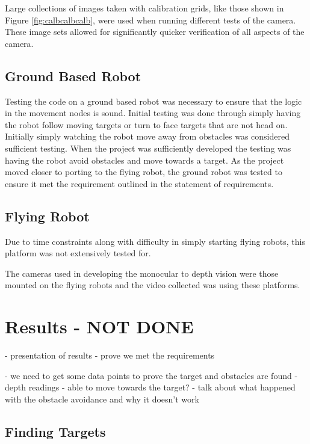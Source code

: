 \documentclass{article}[12]
\begin{document}
	Large collections of images taken with calibration grids, like those shown in Figure \ref{fig:calbcalbcalb}, were used when running different tests of the camera. These image sets allowed for significantly quicker verification of all aspects of the camera.
	
	\subsection{Ground Based Robot}
	
	Testing the code on a ground based robot was necessary to ensure that the logic in the movement nodes is sound. Initial testing was done through simply having the robot follow moving targets or turn to face targets that are not head on. Initially simply watching the robot move away from obstacles was considered sufficient testing. When the project was sufficiently developed the testing was having the robot avoid obstacles and move towards a target. As the project moved closer to porting to the flying robot, the ground robot was tested to ensure it met the requirement outlined in the statement of requirements. \cite{sor}

	\subsection{Flying Robot}
	
	Due to time constraints along with difficulty in simply starting flying robots, this platform was not extensively tested for. 
	
	The cameras used in developing the monocular to depth vision were those mounted on the flying robots and the video collected was using these platforms. 

	
\section{Results - NOT DONE}

	- presentation of results
- prove we met the requirements

- we need to get some data points to prove the target and obstacles are found
- depth readings
- able to move towards the target? 
- talk about what happened with the obstacle avoidance and why it doesn't work


\subsection{Finding Targets}
\end{document}
